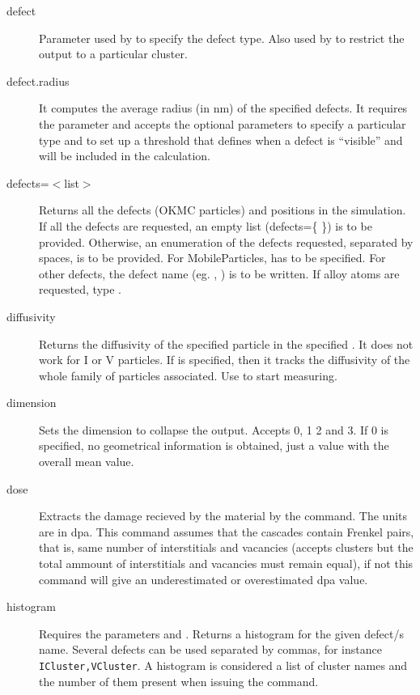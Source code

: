 \begin{description}
\item [defect] Parameter used by  to specify the defect type. Also used by  to restrict the output to a particular cluster.

\item [defect.radius] It computes the average radius (in nm) of the specified defects. It requires the parameter  and accepts the optional parameters  to specify a particular type and  to set up a threshold that defines when a defect is ``visible'' and will be included in the calculation.

\item [defects=$<$list$>$] Returns all the defects (OKMC particles) and positions in the simulation. If all the defects are requested, an empty list (defects=\{ \}) is to be provided. Otherwise, an enumeration of the defects requested, separated by spaces, is to be provided. For MobileParticles,  has to be specified. For other defects, the defect name (eg. , ) is to be written. If alloy atoms are requested, type .

\item [diffusivity] Returns the diffusivity of the specified particle  in the specified  . It does not work for I or V particles. If  is specified, then it tracks the diffusivity of the whole family of particles associated. Use  to start measuring.

\item [dimension] Sets the dimension to collapse the output. Accepts 0, 1 2 and 3. If 0 is specified, no geometrical information is obtained, just a value with the overall mean value.

\item [dose] Extracts the damage recieved by the material by the  command. The units are in dpa. This command assumes that the cascades contain Frenkel pairs, that is, same number of interstitials and vacancies (accepts clusters but the total ammount of interstitials and vacancies must remain equal), if not this command will give an underestimated or overestimated dpa value.

\item [histogram] Requires the parameters  and . Returns a histogram for the given defect/s name. Several defects can be used separated by commas, for instance {\tt ICluster,VCluster}. A histogram is considered a list of cluster names and the number of them present when issuing the command. 


\end{description}
